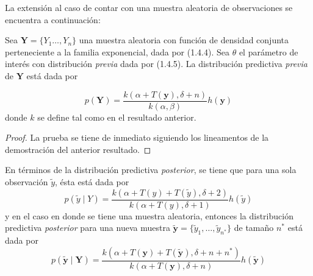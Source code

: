 La extensión al caso de contar con una muestra aleatoria de observaciones se encuentra a continuación:

\begin{Res}
Sea $\mathbf{Y}=\{Y_1\ldots,Y_n\}$ una muestra aleatoria con función de densidad conjunta perteneciente a la familia exponencial, dada por (1.4.4). Sea $\theta$ el parámetro de interés con distribución \emph{previa} dada por (1.4.5). La distribución predictiva \emph{previa} de $\mathbf{Y}$ está dada por

\begin{equation}
p(\mathbf{Y})=\frac{k(\alpha+T(\mathbf{y}),\delta+n)}{k(\alpha,\beta)}h(\mathbf{y})
\end{equation}
donde $k$ se define tal como en el resultado anterior.
\end{Res}

\begin{proof}
La prueba se tiene de inmediato siguiendo los lineamentos de la demostración del anterior resultado.
\end{proof}

\begin{Res}
En términos de la distribución predictiva \emph{posterior}, se tiene que para una sola observación $\tilde{y}$, ésta está dada por
\begin{equation}
p(\tilde{y} \mid Y)=\frac{k(\alpha+T(y)+T(\tilde{y}),\delta+2)}{k(\alpha+T(y),\delta+1)}h(\tilde{y})
\end{equation}
y en el caso en donde se tiene una muestra aleatoria, entonces la distribución predictiva \emph{posterior} para una nueva muestra $\tilde{\mathbf{y}}=\{\tilde{y}_1,\ldots,\tilde{y}_{n^*}\}$ de tamaño $n^*$ está dada por
\begin{equation}
p(\tilde{\mathbf{y}} \mid \mathbf{Y})=
\frac{k(\alpha+T(\mathbf{y})+T(\tilde{\mathbf{y}}),\delta+n+n^*)}
{k(\alpha+T(\mathbf{y}),\delta+n)}h(\tilde{\mathbf{y}})
\end{equation}
\end{Res}

